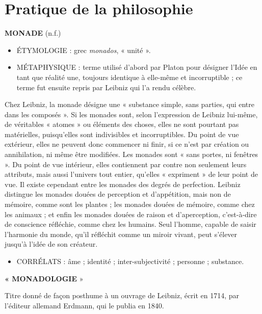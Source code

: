 
\section{Pratique de la philosophie}
{\bf M{\footnotesize ONADE}} (n.f.)

\begin{itemize}[leftmargin=1cm, label=, itemsep=1pt]
\item {\footnotesize ÉTYMOLOGIE} : grec {\it monados}, « unité ».
\item {\footnotesize MÉTAPHYSIQUE} : terme utilisé d’abord par Platon pour désigner l’Idée en tant que réalité une, toujours identique à elle-même et incorruptible ; ce terme fut ensuite repris par Leibniz qui l'a rendu célèbre.
\end{itemize}

Chez Leibniz, la monade désigne une
« substance simple, sans parties, qui
entre dans les composés ». Si les
monades sont, selon l'expression de
Leibniz lui-même, de véritables
« atomes » ou éléments des choses, elles
ne sont pourtant pas matérielles, puisqu'elles sont indivisibles et incorruptibles. Du point de vue extérieur, elles
ne peuvent donc commencer ni finir, si
ce n'est par création ou annihilation, ni
même être modifiées. Les monades sont
« sans portes, ni fenêtres ». Du point de
vue intérieur, elles contiennent par
contre non seulement leurs attributs,
mais aussi l’univers tout entier, qu'elles
« expriment » de leur point de vue. Il
existe cependant entre les monades des
degrés de perfection. Leibniz distingue
les monades douées de perception et
d’appétition, mais non de mémoire,
comme sont les plantes ; les monades
douées de mémoire, comme chez les
animaux ; et enfin les monades douées
de raison et d’aperception, c’est-à-dire
de conscience réfléchie, comme chez
%
les humains. Seul l’homme, capable de
saisir l'harmonie du monde, qu'il réfléchit comme un miroir vivant, peut s'élever jusqu’à l'idée de son créateur.


\begin{itemize}[leftmargin=1cm, label=, itemsep=1pt]
\item {\footnotesize CORRÉLATS} : âme ; identité ; inter-subjectivité ; personne ; substance.
\end{itemize}

{\bf « M{\footnotesize ONADOLOGIE}} »

Titre donné de façon posthume à un
ouvrage de Leibniz, écrit en 1714, par
l'éditeur allemand Erdmann, qui le
publia en 1840.

